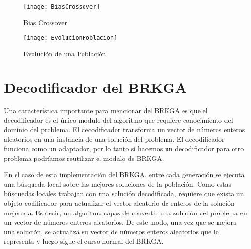 \begin{figure}[h]
	\caption{Bias Crossover}
	\centering
	\texttt{[image: BiasCrossover]}
	\label{fig:biasCrossover}
\end{figure}

\begin{figure}[h]
	\caption{Evolución de una Población}
	\centering
	\texttt{[image: EvolucionPoblacion]}
	\label{fig:evolucion}
\end{figure}

\section{Decodificador del BRKGA}

Una característica importante para mencionar del BRKGA es que el decodificador es el único modulo del algoritmo que requiere conocimiento del dominio del problema. El decodificador transforma un vector de números enteros aleatorios en una instancia de una solución del problema. El decodificador funciona como un adaptador, por lo tanto si hacemos un decodificador para otro problema podríamos reutilizar el modulo de BRKGA.

\bigskip

En el caso de esta implementación del BRKGA, entre cada generación se ejecuta una búsqueda local sobre las mejores soluciones de la población. Como estas búsquedas locales trabajan con una solución decodificada, requiere que exista un objeto codificador para actualizar el vector aleatorio de enteros de la solución mejorada. Es decir, un algoritmo capas de convertir una solución del problema en un vector de números enteros aleatorios. De este modo, una vez que se mejora una solución, se actualiza su vector de números enteros aleatorios que lo representa y luego sigue el curso normal del BRKGA. 


